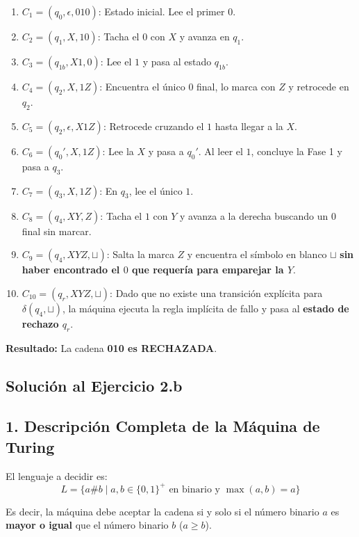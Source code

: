 \begin{enumerate}[label=\arabic*., leftmargin=*]
    \item $C_1 = (q_0, \epsilon, 010)$: Estado inicial. Lee el primer $0$.
    \item $C_2 = (q_1, X, 10)$: Tacha el $0$ con $X$ y avanza en $q_1$.
    \item $C_3 = (q_{1b}, X1, 0)$: Lee el $1$ y pasa al estado $q_{1b}$.
    \item $C_4 = (q_2, X, 1Z)$: Encuentra el único $0$ final, lo marca con $Z$ y retrocede en $q_2$.
    \item $C_5 = (q_2, \epsilon, X1Z)$: Retrocede cruzando el $1$ hasta llegar a la $X$.
    \item $C_6 = (q_0', X, 1Z)$: Lee la $X$ y pasa a $q_0'$. Al leer el $1$, concluye la Fase 1 y pasa a $q_3$.
    \item $C_7 = (q_3, X, 1Z)$: En $q_3$, lee el único $1$.
    \item $C_8 = (q_4, XY, Z)$: Tacha el $1$ con $Y$ y avanza a la derecha buscando un $0$ final sin marcar.
    \item $C_9 = (q_4, XYZ, \sqcup)$: Salta la marca $Z$ y encuentra el símbolo en blanco $\sqcup$ \textbf{sin haber encontrado el $0$ que requería para emparejar la $Y$}.
    \item $C_{10} = (q_r, XYZ, \sqcup)$: Dado que no existe una transición explícita para $\delta(q_4, \sqcup)$, la máquina ejecuta la regla implícita de fallo y pasa al \textbf{estado de rechazo $q_r$}.
\end{enumerate}

\vspace{0.2cm}
\noindent\textbf{Resultado:} La cadena \textbf{010 es RECHAZADA}.

\newpage

\subsection{Solución al Ejercicio 2.b}
\subsection*{1. Descripción Completa de la Máquina de Turing}

El lenguaje a decidir es:
\[ L = \{ a\#b \mid a, b \in \{0, 1\}^+ \text{ en binario y } \max(a, b) = a \} \]

Es decir, la máquina debe aceptar la cadena si y solo si el número binario $a$ es \textbf{mayor o igual} que el número binario $b$ ($a \ge b$).

